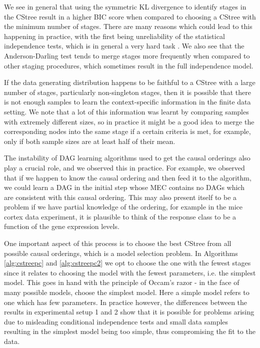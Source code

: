 \documentclass{tufte-book}
\begin{document}
We see in general that using the symmetric KL divergence to identify stages in the CStree result in a higher BIC score when compared to choosing a CStree with the minimum number of stages. There are many reasons which could lead to this happening in practice, with the first being unreliability of the statistical independence tests, which is in general a very hard task \cite{shah-2020-hardn-condit}.  We also see that the Anderson-Darling test tends to merge stages more frequently when compared to other staging procedures, which sometimes result in the full independence model. 


If the data generating distribution happens to be faithful to a CStree with a large number of stages, particularly non-singleton stages, then it is possible that there is not enough samples to learn the context-specific information in the finite data setting. We note that a lot of this information was learnt by comparing samples with extremely different sizes, so in practice it might be a good idea to merge the corresponding nodes into the same stage if a certain criteria is met, for example, only if both sample sizes are at least half of their mean.


The instability of DAG learning algorithms used to get the causal orderings also play a crucial role, and we observed this in practice. For example, we observed that if we happen to know the causal ordering and then feed it to the algorithm, we could learn a DAG in the initial step whose MEC contains no DAGs which are consistent with this causal ordering.  This may also present itself to be a problem if we have partial knowledge of the ordering, for example in the mice cortex data experiment, it is plausible to think of the response class to be a function of the gene expression levels.


One important aspect of this process is to choose the best CStree from all possible causal orderings, which is a model selection problem. In Algorithms \ref{alg:cstreepc} and \ref{alg:cstreepc2} we opt to choose the one with the fewest stages since it relates to choosing the model with the fewest parameters, i.e. the simplest model. This goes in hand with the principle of Occam's razor \cite{pearl-2009-causal} - in the face of many possible models, choose the simplest model. Here a simple model refers to one which has few parameters. In practice however, the differences between the results in experimental setup 1 and 2 show that it is possible for problems arising due to misleading conditional independence tests and small data samples resulting in the simplest model being too simple, thus compromising the fit to the data.
\end{document}
